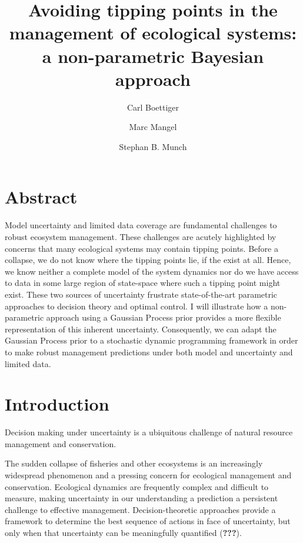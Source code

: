 \documentclass[author-year, review]{elsarticle} %
\begin{document}
\begin{frontmatter}
  \title{Avoiding tipping points in the management of ecological systems: a
non-parametric Bayesian approach}
  \author[cstar]{Carl Boettiger}
  \author[cstar]{Marc Mangel}
  \author[noaa]{Stephan B. Munch}
  \address[cstar]{Center for Stock Assessment Research, Department of Applied Math and Statistics, University of California, Mail Stop SOE-2, Santa Cruz, CA 95064, USA}
  \address[noaa]{Southwest Fisheries Science Center, National Oceanic and Atmospheric Administration, 110 Shaffer Road, Santa Cruz, CA 95060, USA}
 \end{frontmatter}


\section{Abstract}\label{abstract}

Model uncertainty and limited data coverage are fundamental challenges
to robust ecosystem management. These challenges are acutely highlighted
by concerns that many ecological systems may contain tipping points.
Before a collapse, we do not know where the tipping points lie, if the
exist at all. Hence, we know neither a complete model of the system
dynamics nor do we have access to data in some large region of
state-space where such a tipping point might exist. These two sources of
uncertainty frustrate state-of-the-art parametric approaches to decision
theory and optimal control. I will illustrate how a non-parametric
approach using a Gaussian Process prior provides a more flexible
representation of this inherent uncertainty. Consequently, we can adapt
the Gaussian Process prior to a stochastic dynamic programming framework
in order to make robust management predictions under both model and
uncertainty and limited data.

\section{Introduction}\label{introduction}

Decision making under uncertainty is a ubiquitous challenge of natural
resource management and conservation.

The sudden collapse of fisheries and other ecosystems is an increasingly
widespread phenomenon and a pressing concern for ecological management
and conservation. Ecological dynamics are frequently complex and
difficult to measure, making uncertainty in our understanding a
prediction a persistent challenge to effective management.
Decision-theoretic approaches provide a framework to determine the best
sequence of actions in face of uncertainty, but only when that
uncertainty can be meaningfully quantified ({\textbf{???}}).
\end{document}
